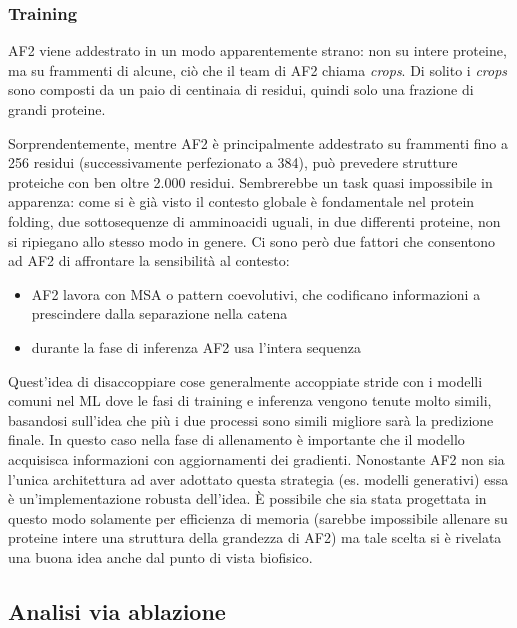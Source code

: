 \subsubsection{Training}

AF2 viene addestrato in un modo apparentemente strano: non su intere proteine, ma su frammenti di alcune, ciò che il team di AF2 chiama \textit{crops}. Di solito i \textit{crops} sono composti da un paio di centinaia di residui, quindi solo una frazione di grandi proteine.

\par Sorprendentemente, mentre AF2 è principalmente addestrato su frammenti fino a 256 residui (successivamente perfezionato a 384), può prevedere strutture proteiche con ben oltre 2.000 residui. Sembrerebbe un task quasi impossibile in apparenza: come si è già visto il contesto globale è fondamentale nel protein folding, due sottosequenze di amminoacidi uguali, in due differenti proteine, non si ripiegano allo stesso modo in genere. Ci sono però due fattori che consentono ad AF2 di affrontare la sensibilità al contesto:

\begin{itemize}
	\item AF2 lavora con MSA o pattern coevolutivi, che codificano informazioni a prescindere dalla separazione nella catena
	\item durante la fase di inferenza AF2 usa l'intera sequenza
\end{itemize}

Quest'idea di disaccoppiare cose generalmente accoppiate stride con i modelli comuni nel ML dove le fasi di training e inferenza vengono tenute molto simili, basandosi sull'idea che più i due processi sono simili migliore sarà la predizione finale. In questo caso nella fase di allenamento è importante che il modello acquisisca informazioni con aggiornamenti dei gradienti. Nonostante AF2 non sia l'unica architettura ad aver adottato questa strategia (es. modelli generativi) essa è un’implementazione robusta dell’idea. È possibile che sia stata progettata in questo modo solamente per efficienza di memoria (sarebbe impossibile allenare su proteine intere una struttura della grandezza di AF2) ma tale scelta si è rivelata una buona idea anche dal punto di vista biofisico.

\subsection{Analisi via ablazione}

